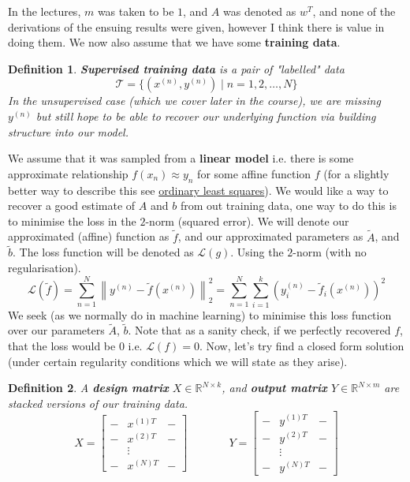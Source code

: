 \documentclass[letterpaper, 12pt]{article}
\newcommand{\R}{\mathbb{R}}	%
\newcommand{\1}{\mathds{1}}	%
\newtheorem{definition}{Definition}[section]
\newcommand\norm[1]{\left\lVert#1\right\rVert}
\begin{document}
In the lectures, \(m\) was taken to be \(1\), and \(A\) was denoted as \(w^T\), and none of the derivations of the ensuing results were given, however I think there is value in doing them. We now also assume that we have some \textbf{training data}.
\begin{definition}
    \textbf{Supervised training data} is a pair of "labelled" data
    \[
        \mathscr{T} = \{(x^{(n)}, y^{(n)}) \mid n=1,2,\ldots,N\}
    \]
    In the unsupervised case (which we cover later in the course), we are missing \(y^{(n)}\) but still hope to be able to recover our underlying function via building structure into our model.
\end{definition}
We assume that it was sampled from a \textbf{linear model} i.e. there is some approximate relationship \(f(x_n) \approx y_n\) for some affine function \(f\) (for a slightly better way to describe this see \href{https://en.wikipedia.org/wiki/Ordinary_least_squares}{ordinary least squares}). We would like a way to recover a good estimate of \(A\) and \(b\) from out training data, one way to do this is to minimise the loss in the \(2\)-norm (squared error). We will denote our approximated (affine) function as \(\tilde{f}\), and our approximated parameters as \(\tilde{A}\), and \(\tilde{b}\). The loss function will be denoted as \(\mathscr{L}(g)\). Using the \(2\)-norm (with no regularisation).
\begin{equation}
    \label{eqn: lsq loss}
    \mathscr{L}(\tilde{f}) = \sum_{n=1}^N \norm{y^{(n)} - \tilde{f}(x^{(n)})}^2_2 = \sum_{n=1}^N \sum_{i=1}^k (y^{(n)}_i - \tilde{f}_i(x^{(n)}))^2
\end{equation}
We seek (as we normally do in machine learning) to minimise this loss function over our parameters \(\tilde{A}\), \(\tilde{b}\).
Note that as a sanity check, if we perfectly recovered \(f\), that the loss would be \(0\) i.e. \(\mathscr{L}(f) = 0\). 
Now, let's try find a closed form solution (under certain regularity conditions which we will state as they arise). 
\begin{definition}
    \label{def:design matrix}
    A \textbf{design matrix} \(X \in \R^{N\times k}\), and \textbf{output matrix} \(Y\in \R^{N \times m}\) are stacked versions of our training data.
    \begin{equation*}
        X = 
        \begin{bmatrix}
            -&x^{(1)T} &-\\ -&x^{(2)T}&- \\ &\vdots& \\ -&x^{(N)T}&-
        \end{bmatrix} \hspace{45pt}
        Y = 
        \begin{bmatrix}
            -&y^{(1)T}&- \\ - &y^{(2)T}&- \\ & \vdots&  \\ - & y^{(N)T} & -
        \end{bmatrix}
    \end{equation*}
\end{definition}
\end{document}
